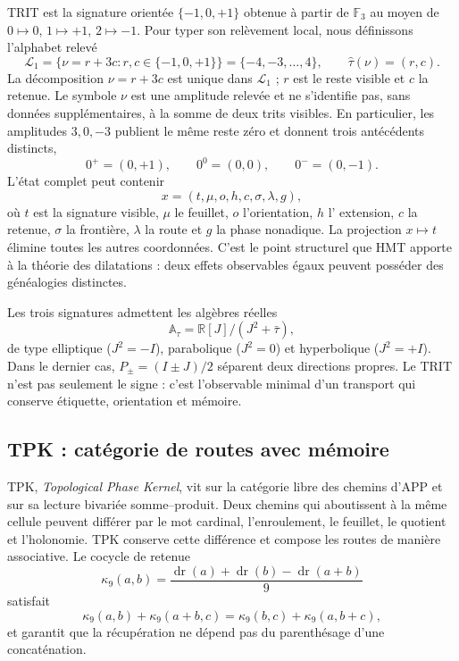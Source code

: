 TRIT est la signature orientée $\{-1,0,+1\}$ obtenue à partir de $\mathbb F_3$ au moyen de
$0\mapsto0$, $1\mapsto+1$, $2\mapsto-1$. Pour typer son relèvement local,
nous définissons l'alphabet relevé
\[
 \mathcal L_1=\{\nu=r+3c:r,c\in\{-1,0,+1\}\}
 =\{-4,-3,\ldots,4\},
 \qquad
 \widehat\tau(\nu)=(r,c).
 \tag{GMC-2.7}
\]
La décomposition $\nu=r+3c$ est unique dans $\mathcal L_1$ ; $r$ est le reste
visible et $c$ la retenue. Le symbole $\nu$ est une amplitude relevée et ne
s'identifie pas, sans données supplémentaires, à la somme de deux trits visibles. En particulier,
les amplitudes $3,0,-3$ publient le même reste zéro et donnent trois antécédents
distincts,
\[
 0^+=(0,+1),\qquad 0^0=(0,0),\qquad0^-=(0,-1).
 \tag{GMC-2.8}
\]
L'état complet peut contenir
\[
 x=(t,\mu,o,h,c,\sigma,\lambda,g),
 \tag{GMC-2.9}
\]
où $t$ est la signature visible, $\mu$ le feuillet, $o$ l'orientation, $h$ l'
extension, $c$ la retenue, $\sigma$ la frontière, $\lambda$ la route et $g$ la
phase nonadique. La projection $x\mapsto t$ élimine toutes les autres
coordonnées. C'est le point structurel que HMT apporte à la théorie des
dilatations : deux effets observables égaux peuvent posséder des généalogies
distinctes.

Les trois signatures admettent les algèbres réelles
\[
 \mathbb A_\tau=\mathbb R[J]/(J^2+\bar\tau),
\]
de type elliptique ($J^2=-I$), parabolique ($J^2=0$) et hyperbolique
($J^2=+I$). Dans le dernier cas, $P_\pm=(I\pm J)/2$ séparent deux directions
propres. Le TRIT n'est pas seulement le signe : c'est l'observable minimal d'un transport
qui conserve étiquette, orientation et mémoire.

\subsection{TPK : catégorie de routes avec mémoire}

TPK, \emph{Topological Phase Kernel}, vit sur la catégorie libre des
chemins d'APP et sur sa lecture bivariée somme--produit. Deux chemins qui
aboutissent à la même cellule peuvent différer par le mot cardinal, l'enroulement,
le feuillet, le quotient et l'holonomie. TPK conserve cette différence et compose les routes de
manière associative. Le cocycle de retenue
\[
 \kappa_9(a,b)=
 \frac{\operatorname{dr}(a)+\operatorname{dr}(b)
       -\operatorname{dr}(a+b)}9
\]
satisfait
\[
 \kappa_9(a,b)+\kappa_9(a+b,c)
 =\kappa_9(b,c)+\kappa_9(a,b+c),
 \tag{GMC-2.10}
\]
et garantit que la récupération ne dépend pas du parenthésage d'une
concaténation.

